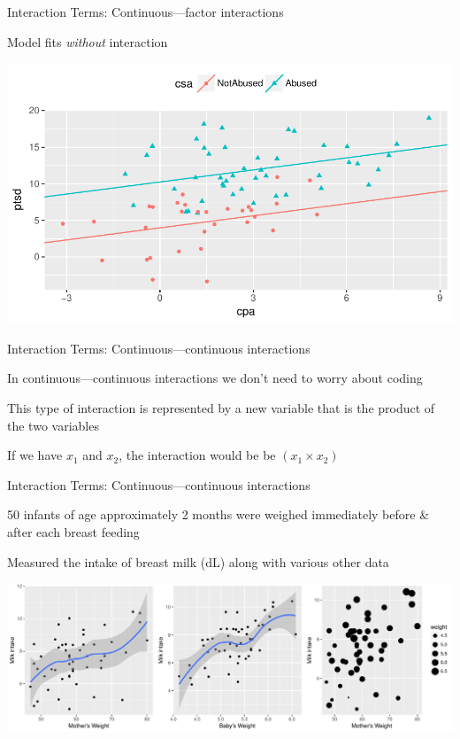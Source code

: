 \documentclass[10pt,ignorenonframetext,compress, aspectratio=169]{beamer}
\begin{document}
\begin{frame}{Interaction Terms: Continuous---factor interactions}

Model fits \emph{without} interaction

\begin{center}\includegraphics[width=0.7\linewidth]{03-linear-models_files/figure-beamer/sex-abuse-plot-additive-model-1} \end{center}

\end{frame}

\begin{frame}{Interaction Terms: Continuous---continuous interactions}

In continuous---continuous interactions we don't need to worry about
coding

This type of interaction is represented by a new variable that is the
product of the two variables

If we have \(x_1\) and \(x_2\), the interaction would be be
\((x_1 \times x_2)\)

\end{frame}

\begin{frame}{Interaction Terms: Continuous---continuous interactions}

50 infants of age approximately 2 months were weighed immediately before
\& after each breast feeding

Measured the intake of breast milk (dL) along with various other data

\begin{center}\includegraphics[width=\textwidth]{03-linear-models_files/figure-beamer/kfm-data-1} \end{center}

\end{frame}
\end{document}
